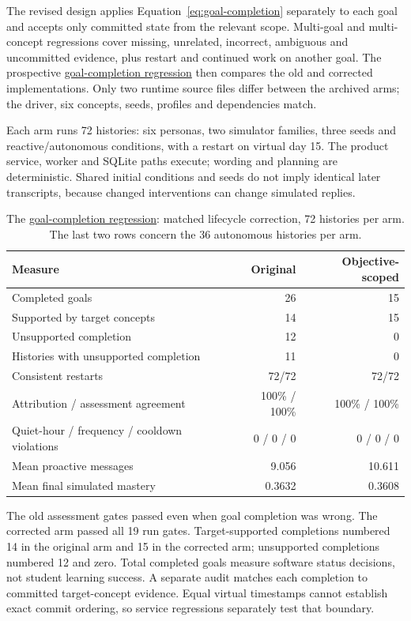 The revised design applies Equation~\ref{eq:goal-completion} separately to each
goal and accepts only committed state from the relevant scope. Multi-goal and
multi-concept regressions cover missing, unrelated, incorrect, ambiguous and
uncommitted evidence, plus restart and continued work on another goal. The
prospective \hyperref[study-H]{goal-completion regression} then compares the old and corrected implementations.
Only two runtime source files differ between the archived arms; the driver,
six concepts, seeds, profiles and dependencies match.

Each arm runs 72 histories: six personas, two simulator families, three seeds
and reactive/autonomous conditions, with a restart on virtual day 15. The
product service, worker and SQLite paths execute; wording and planning are
deterministic. Shared initial conditions and seeds do not imply identical
later transcripts, because changed interventions can change simulated replies.

\begin{table}[htbp]
\centering\small
\caption{The \hyperref[study-H]{goal-completion regression}: matched lifecycle correction, 72 histories per arm.
The last two rows concern the 36 autonomous histories per arm.}
\label{tab:goal-correction}
\begin{tabularx}{\linewidth}{@{}Yrr@{}}
\toprule Measure & Original & Objective-scoped \\\midrule
Completed goals & 26 & 15 \\
Supported by target concepts & 14 & 15 \\
Unsupported completion & 12 & 0 \\
Histories with unsupported completion & 11 & 0 \\
Consistent restarts & 72/72 & 72/72 \\
Attribution / assessment agreement & 100\% / 100\% & 100\% / 100\% \\
Quiet-hour / frequency / cooldown violations & 0 / 0 / 0 & 0 / 0 / 0 \\\midrule
Mean proactive messages & 9.056 & 10.611 \\
Mean final simulated mastery & 0.3632 & 0.3608 \\
\bottomrule
\end{tabularx}
\end{table}

The old assessment gates passed even when goal completion was wrong. The
corrected arm passed all 19 run gates. Target-supported completions numbered
14 in the original arm and 15 in the corrected arm; unsupported completions
numbered 12 and zero. Total completed goals measure software status decisions,
not student learning success. A separate audit matches each completion to committed
target-concept evidence. Equal virtual timestamps cannot establish exact commit
ordering, so service regressions separately test that boundary.

